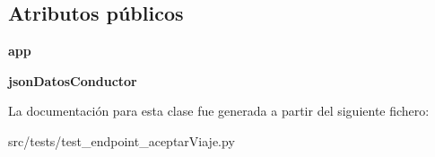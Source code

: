 \subsection*{Atributos públicos}
\begin{DoxyCompactItemize}
\item 
\hypertarget{classsrc_1_1tests_1_1test__endpoint__aceptar_viaje_1_1_test_endpoint_aceptar_viaje_ab1481299733f2664fd6ca8687f924e02}{{\bfseries app}}\label{classsrc_1_1tests_1_1test__endpoint__aceptar_viaje_1_1_test_endpoint_aceptar_viaje_ab1481299733f2664fd6ca8687f924e02}

\item 
\hypertarget{classsrc_1_1tests_1_1test__endpoint__aceptar_viaje_1_1_test_endpoint_aceptar_viaje_ad09d9381f328313f3da897e4c7dafced}{{\bfseries json\-Datos\-Conductor}}\label{classsrc_1_1tests_1_1test__endpoint__aceptar_viaje_1_1_test_endpoint_aceptar_viaje_ad09d9381f328313f3da897e4c7dafced}

\end{DoxyCompactItemize}


La documentación para esta clase fue generada a partir del siguiente fichero\-:\begin{DoxyCompactItemize}
\item 
src/tests/test\-\_\-endpoint\-\_\-aceptar\-Viaje.\-py\end{DoxyCompactItemize}

